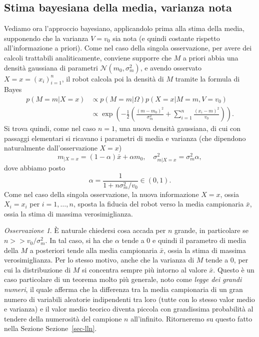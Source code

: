 \documentclass[
  italian,
  letterpaper,
]{book}
\newcommand{\bra}[1]{\left( #1 \right)}
\theoremstyle{definition}
\theoremstyle{remark}
\newtheorem*{remark}{Osservazione}
\begin{document}
\subsection{Stima bayesiana della media, varianza
nota}\label{stima-bayesiana-della-media-varianza-nota}

Vediamo ora l'approccio bayesiano, applicandolo prima alla stima della
media, supponendo che la varianza \(V = v_0\) sia nota (e quindi
costante rispetto all'informazione a priori). Come nel caso della
singola osservazione, per avere dei calcoli trattabili analiticamente,
conviene supporre che \(M\) a priori abbia una densità gaussiana di
parametri \(\mathcal{N}(m_0, \sigma_m^2)\), e avendo osservato
\(X=x= (x_i)_{i=1}^n\), il robot calcola poi la densità di \(M\) tramite
la formula di Bayes
\[ \begin{split} p(M=m| X=x) & \propto p(M=m|\Omega ) p(X=x | M=m, V=v_0) \\
& \propto \exp\bra{ -\frac 1 2 \bra{ \frac{ (m-m_0)^2}{\sigma_m^2} + \sum_{i=1}^n \frac { (x_i-m)^2}{v_0} }}.\end{split}\]
Si trova quindi, come nel caso \(n=1\), una nuova densità gaussiana, di
cui con passaggi elementari si ricavano i parametri di media e varianza
(che dipendono naturalmente dall'osservazione \(X=x\))
\[ m_{|X=x} = (1-\alpha) \bar{x} + \alpha m_0, \quad \sigma^2_{m|X=x} = \sigma_m^2\alpha,\]
dove abbiamo posto \[\alpha = \frac{1}{1+n\sigma_m^2/v_0 } \in (0,1).\]
Come nel caso della singola osservazione, la nuova informazione \(X=x\),
ossia \(X_i=x_i\) per \(i=1, \ldots, n\), sposta la fiducia del robot
verso la media campionaria \(\bar{x}\), ossia la stima di massima
verosimiglianza.

\begin{remark}
È naturale chiedersi cosa accada per \(n\) grande, in particolare se
\(n >> v_0/\sigma_m^2\). In tal caso, si ha che \(\alpha\) tende a \(0\)
e quindi il parametro di media della \(M\) a posteriori tende alla media
campionaria \(\bar{x}\), ossia la stima di massima verosimiglianza. Per
lo stesso motivo, anche che la varianza di \(M\) tende a \(0\), per cui
la distribuzione di \(M\) si concentra sempre più intorno al valore
\(\bar{x}\). Questo è un caso particolare di un teorema molto più
generale, noto come \emph{legge dei grandi numeri}, il quale afferma che
la differenza tra la media campionaria di un gran numero di variabili
aleatorie indipendenti tra loro (tutte con lo stesso valor medio e
varianza) e il valor medio teorico diventa piccola con grandissima
probabilità al tendere della numerosità del campione \(n\) all'infinito.
Ritorneremo su questo fatto nella Sezione Sezione~\ref{sec-lln}.
\end{remark}
\end{document}
